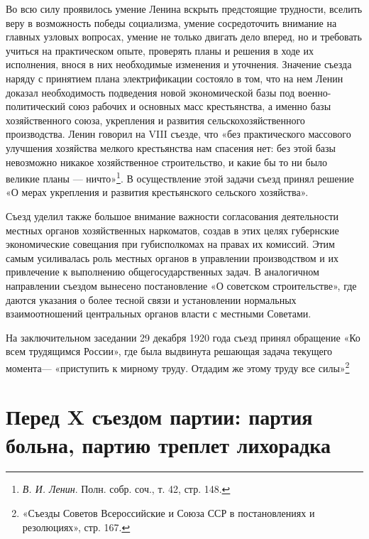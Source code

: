 \documentclass[12pt, a4paper, openany]{book}
\begin{document}
Во всю силу проявилось умение Ленина вскрыть предстоящие трудности, вселить веру в возможность победы социализма, умение сосредоточить внимание на главных узловых вопросах, умение не только двигать дело вперед, но и требовать учиться на практическом опыте, проверять планы и решения в ходе их исполнения, внося в них необходимые изменения и уточнения. Значение съезда наряду с принятием плана электрификации состояло в том, что на нем Ленин доказал необходимость подведения новой экономической базы под военно-политический союз рабочих и основных масс крестьянства, а именно базы хозяйственного союза, укрепления и развития сельскохозяйственного производства. Ленин говорил на VIII съезде, что «без практического массового улучшения хозяйства мелкого крестьянства нам спасения нет: без этой базы невозможно никакое хозяйственное строительство, и какие бы то ни было великие планы — ничто»\footnote{\textit{В. И. Ленин}. Полн. собр. соч., т. 42, стр. 148.}. В осуществление этой задачи съезд принял решение «О мерах укрепления и развития крестьянского сельского хозяйства».

Съезд уделил также большое внимание важности согласования деятельности местных органов хозяйственных наркоматов, создав в этих целях губернские экономические совещания при губисполкомах на правах их комиссий. Этим самым усиливалась роль местных органов в управлении производством и их привлечение к выполнению общегосударственных задач. В аналогичном направлении съездом вынесено постановление «О советском строительстве», где даются указания о более тесной связи и установлении нормальных взаимоотношений центральных органов власти с местными Советами.

На заключительном заседании 29 декабря 1920 года съезд принял обращение «Ко всем трудящимся России», где была выдвинута решающая задача текущего момента— «приступить к мирному труду. Отдадим же этому труду все силы»\footnote{«Съезды Советов Всероссийские и Союза ССР в постановлениях и резолюциях», стр. 167.}

\newpage
\section[Перед X съездом партии: партия больна, партию треплет лихорадка]{\center \textbf{Перед X съездом партии: партия больна, партию треплет лихорадка}}
\end{document}
